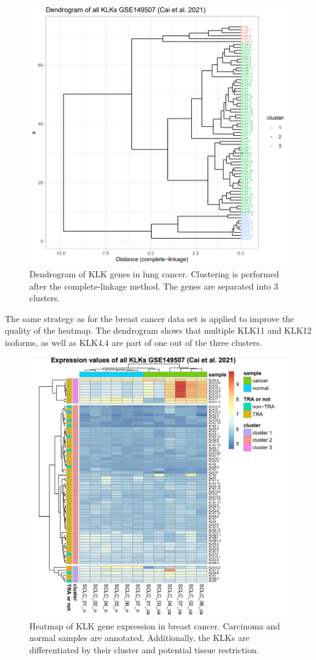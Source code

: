 \documentclass[
]{article}
\begin{document}
\begin{figure}

{\centering \includegraphics[width=0.5\linewidth]{images/Dendrogram_lung} 

}

\caption{Dendrogram of KLK genes in lung cancer. Clustering is performed after the complete-linkage method. The genes are separated into 3 clusters.}\label{fig:Dendrogram - lung }
\end{figure}

The same strategy as for the breast cancer data set is applied to
improve the quality of the heatmap. The dendrogram shows that multiple
KLK11 and KLK12 isoforms, as well as KLK4.4 are part of one out of the
three clusters.

\begin{figure}

{\centering \includegraphics[width=0.5\linewidth]{images/Heatmap_lung} 

}

\caption{Heatmap of KLK gene expression in breast cancer. Carcinoma and normal samples are annotated. Additionally, the KLKs are differentiated by their cluster and potential tissue restriction.}\label{fig:Heatmap - lung }
\end{figure}
\end{document}
